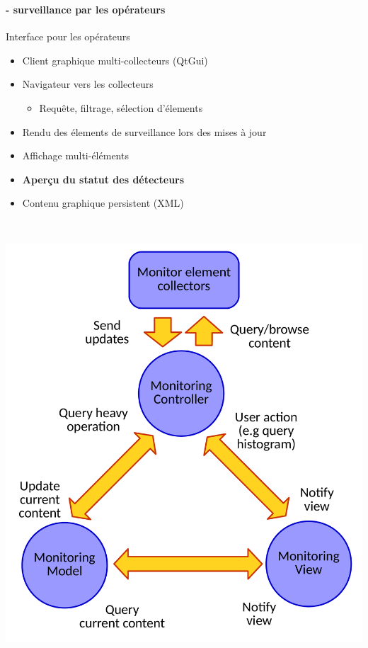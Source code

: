 \documentclass[8pt]{beamer}
\begin{document}
  \begin{frame}
  \frametitle{\secname}
  \framesubtitle{\subsecname - surveillance par les opérateurs}
    \begin{minipage}{0.5\linewidth}
      \begin{block}{Interface pour les opérateurs}
        \begin{itemize}
          \item Client graphique multi-collecteurs (QtGui)
          \item Navigateur vers les collecteurs
          \begin{itemize}
            \item Requête, filtrage, sélection d'élements
          \end{itemize}
          \item Rendu des élements de surveillance lors des mises à jour
          \item Affichage multi-éléments
          \item \textbf{Aperçu du statut des détecteurs}
          \item Contenu graphique persistent (XML)
        \end{itemize}
      \end{block}
    \end{minipage} ~\hfill
    \begin{minipage}{0.47\linewidth}
      \begin{center}
        \includegraphics[width=\linewidth]{MonitoringMVCDiagram.pdf}
      \end{center}
    \end{minipage}
  \end{frame}
\end{document}
